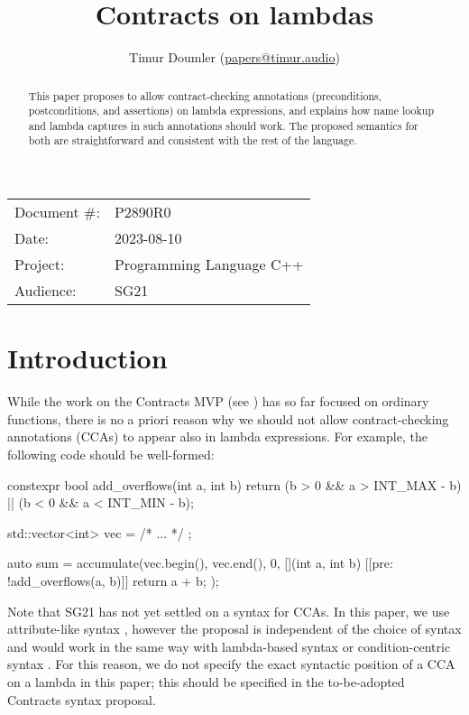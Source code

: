 


\title{Contracts on lambdas}
\author{ Timur Doumler \small(\href{mailto:papers@timur.audio}{papers@timur.audio})}
\date{}
\maketitle

\begin{tabular}{ll}
Document \#: & P2890R0 \\
Date: &2023-08-10 \\
Project: & Programming Language C++ \\
Audience: & SG21
\end{tabular}

\begin{abstract}
This paper proposes to allow contract-checking annotations (preconditions, postconditions, and assertions) on lambda expressions, and explains how name lookup and lambda captures in such annotations should work. The proposed semantics for both are straightforward and consistent with the rest of the language.\end{abstract}

\section{Introduction}
\label{sec:intro}

While the work on the Contracts MVP (see \cite{P2388R4}) has so far focused on ordinary functions, there is no a priori reason why we should not allow contract-checking annotations (CCAs) to appear also in lambda expressions. For example, the following code should be well-formed:
\begin{codeblock}
constexpr bool add_overflows(int a, int b) {
  return (b > 0 && a > INT_MAX - b) || (b < 0 && a < INT_MIN - b);
}

std::vector<int> vec = { /* ... */ };

auto sum = accumulate(vec.begin(), vec.end(), 0, [](int a, int b)
  [[pre: !add_overflows(a, b)]] {
    return a + b;
  });
\end{codeblock}

Note that SG21 has not yet settled on a syntax for CCAs. In this paper, we use attribute-like syntax \cite{P2487R0}, however the proposal is independent of the choice of syntax and would work in the same way with lambda-based syntax \cite{P2461R1} or condition-centric syntax \cite{P2737R0}. For this reason, we do not specify the exact syntactic position of a CCA on a lambda in this paper; this should be specified in the to-be-adopted Contracts syntax proposal.

